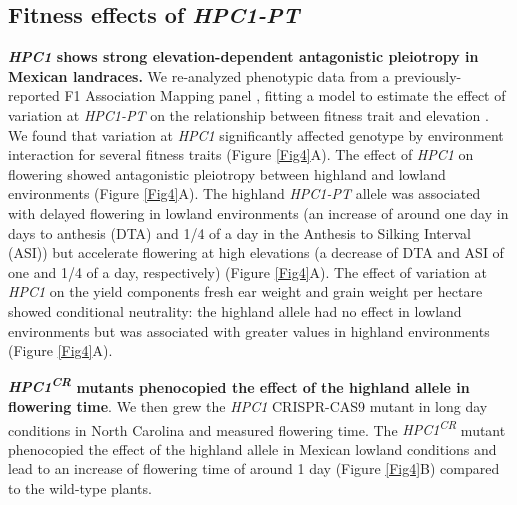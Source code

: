 \documentclass[9pt,twocolumn,twoside,lineno]{BioRxiv}
\begin{document}
\subsection{Fitness effects of \textit{HPC1-PT}}
\textbf{\textit{HPC1} shows strong elevation-dependent antagonistic pleiotropy in Mexican landraces.} 
We re-analyzed phenotypic data from a previously-reported F1 Association Mapping panel \cite{Romero_Navarro2017-cn} \cite{Gates2019-xu} , fitting a model to estimate the effect of variation at \textit{HPC1-PT} on the relationship between fitness trait and elevation \cite{Runcie2019-Gr}. 
We found that variation at \textit{HPC1} significantly affected genotype by environment interaction for several fitness traits (Figure \ref{Fig4}A). 
The effect of \textit{HPC1} on flowering showed antagonistic pleiotropy between highland and lowland environments (Figure \ref{Fig4}A). 
The highland \textit{HPC1-PT} allele was associated with delayed flowering in lowland environments (an increase of around one day in days to anthesis (DTA)  and 1/4 of a day in the  Anthesis to Silking Interval (ASI)) but accelerate flowering at high elevations (a decrease of DTA and ASI of one and 1/4 of a day, respectively) (Figure \ref{Fig4}A).
The effect of  variation at \textit{HPC1} on the yield components fresh ear weight and grain weight per hectare showed conditional neutrality: the highland allele had no effect in lowland environments but was associated with greater values in highland environments (Figure \ref{Fig4}A).

\textbf{\textit{HPC1\textsuperscript{CR}} mutants phenocopied the effect of the highland allele in flowering time}.
We then grew the \textit{HPC1} CRISPR-CAS9 mutant in long day conditions in North Carolina and measured flowering time. 
The \textit{HPC1\textsuperscript{CR}} mutant phenocopied the effect of the highland allele in Mexican lowland conditions and lead to an increase of flowering time of around 1 day (Figure \ref{Fig4}B) compared to the wild-type plants. 
\end{document}
